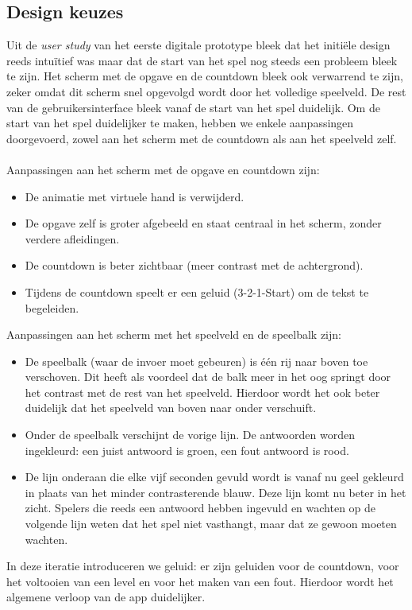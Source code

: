 \documentclass[11pt]{article}
\begin{document}
	\subsection{Design keuzes}
Uit de \textit{user study} van het eerste digitale prototype bleek dat het initi\"ele design reeds intu\"itief was maar dat de start van het spel nog steeds een probleem bleek te zijn. Het scherm met de opgave en de countdown bleek ook verwarrend te zijn, zeker omdat dit scherm snel opgevolgd wordt door het volledige speelveld. De rest van de gebruikersinterface bleek vanaf de start van het spel duidelijk. Om de start van het spel duidelijker te maken, hebben we enkele aanpassingen doorgevoerd, zowel aan het scherm met de countdown als aan het speelveld zelf.\\\\
Aanpassingen aan het scherm met de opgave en countdown zijn:
\begin{itemize}
\item De animatie met virtuele hand is verwijderd.
\item De opgave zelf is groter afgebeeld en staat centraal in het scherm, zonder verdere afleidingen.
\item De countdown is beter zichtbaar (meer contrast met de achtergrond).
\item Tijdens de countdown speelt er een geluid (3-2-1-Start) om de tekst te begeleiden.
\end{itemize}
Aanpassingen aan het scherm met het speelveld en de speelbalk zijn:   
\begin{itemize}
\item De speelbalk (waar de invoer moet gebeuren) is \'e\'en rij naar boven toe verschoven. Dit heeft als voordeel dat de balk meer in het oog springt door het contrast met de rest van het speelveld. Hierdoor wordt het ook beter duidelijk dat het speelveld van boven naar onder verschuift.
\item Onder de speelbalk verschijnt de vorige lijn. De antwoorden worden ingekleurd: een juist antwoord is groen, een fout antwoord is rood.
\item De lijn onderaan die elke vijf seconden gevuld wordt is vanaf nu geel gekleurd in plaats van het minder contrasterende blauw. Deze lijn komt nu beter in het zicht. Spelers die reeds een antwoord hebben ingevuld en wachten op de volgende lijn weten dat het spel niet vasthangt, maar dat ze gewoon moeten wachten.
\end{itemize}
In deze iteratie introduceren we geluid: er zijn geluiden voor de countdown, voor het voltooien van een level en voor het maken van een fout. Hierdoor wordt het algemene verloop van de app duidelijker.\\\\
\end{document}
